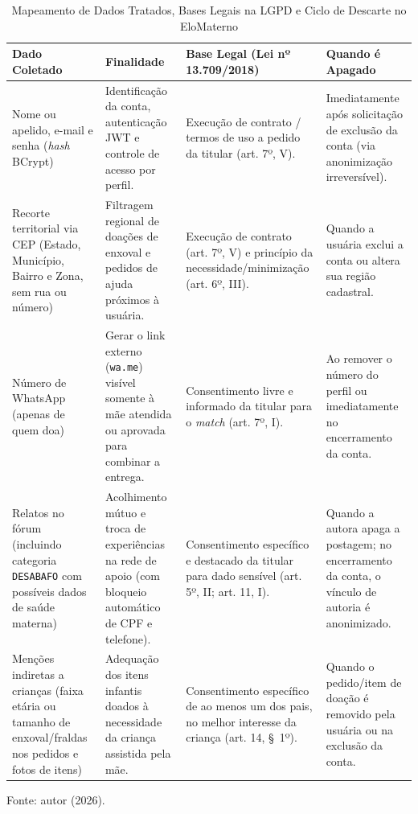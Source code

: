 \begin{table}[H]
\centering
\singlespacing
\caption{Mapeamento de Dados Tratados, Bases Legais na LGPD e Ciclo de Descarte no EloMaterno}
\label{tab:lgpd_dados}
\small
\begin{tabular}{p{3.2cm}p{4.1cm}p{4.2cm}p{3.2cm}}
\toprule
\textbf{Dado Coletado} & \textbf{Finalidade} & \textbf{Base Legal (Lei nº 13.709/2018)} & \textbf{Quando é Apagado} \\
\midrule
Nome ou apelido, e-mail e senha (\textit{hash} BCrypt) & Identificação da conta, autenticação JWT e controle de acesso por perfil. & Execução de contrato / termos de uso a pedido da titular (art. 7º, V). & Imediatamente após solicitação de exclusão da conta (via anonimização irreversível). \\
\addlinespace
Recorte territorial via CEP (Estado, Município, Bairro e Zona, sem rua ou número) & Filtragem regional de doações de enxoval e pedidos de ajuda próximos à usuária. & Execução de contrato (art. 7º, V) e princípio da necessidade/minimização (art. 6º, III). & Quando a usuária exclui a conta ou altera sua região cadastral. \\
\addlinespace
Número de WhatsApp (apenas de quem doa) & Gerar o link externo (\texttt{wa.me}) visível somente à mãe atendida ou aprovada para combinar a entrega. & Consentimento livre e informado da titular para o \textit{match} (art. 7º, I). & Ao remover o número do perfil ou imediatamente no encerramento da conta. \\
\addlinespace
Relatos no fórum (incluindo categoria \texttt{DESABAFO} com possíveis dados de saúde materna) & Acolhimento mútuo e troca de experiências na rede de apoio (com bloqueio automático de CPF e telefone). & Consentimento específico e destacado da titular para dado sensível (art. 5º, II; art. 11, I). & Quando a autora apaga a postagem; no encerramento da conta, o vínculo de autoria é anonimizado. \\
\addlinespace
Menções indiretas a crianças (faixa etária ou tamanho de enxoval/fraldas nos pedidos e fotos de itens) & Adequação dos itens infantis doados à necessidade da criança assistida pela mãe. & Consentimento específico de ao menos um dos pais, no melhor interesse da criança (art. 14, \S~1º). & Quando o pedido/item de doação é removido pela usuária ou na exclusão da conta. \\
\bottomrule
\end{tabular}
\vspace{0.15cm}

{\small Fonte: autor (2026).}
\end{table}
